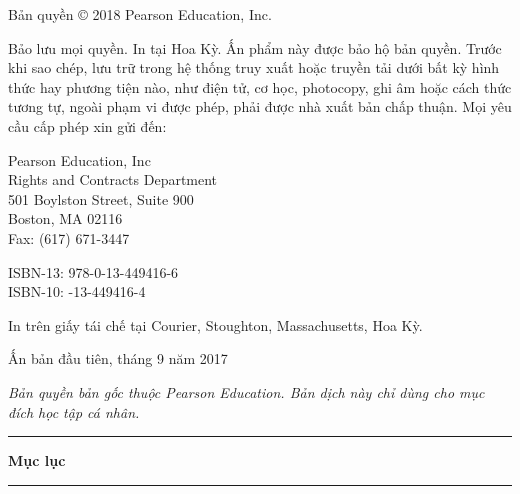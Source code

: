 \documentclass[10pt,twoside,openright]{book}
\makeatletter
\renewcommand{\cleardoublepage}{\clearpage}
\def\cc@pretop{-2.6pt}
\def\cc@fr@afterA{0.3pt}
\def\cc@fr@afterB{12.7pt}
\def\cc@fr@bodygap{35.6pt}
\def\@makeschapterhead#1{%
  \vspace*{\cc@pretop}%
  {\parindent\z@\raggedleft
    \rule{\textwidth}{0.75pt}\par
    \addvspace{\cc@fr@afterA}%
    {\fontsize{36}{40}\selectfont\bfseries #1\par}%
    \addvspace{\cc@fr@afterB}%
    \rule{\textwidth}{0.75pt}\par
    \addvspace{\cc@fr@bodygap}%
  }%
  \par\nobreak
  \setcounter{footnote}{0}%
}
\renewcommand{\contentsname}{Mục lục}
\newcommand{\cctableofcontents}{%
  \cleardoublepage
  \thispagestyle{plain}%
  \markboth{\contentsname}{\contentsname}%
  \@makeschapterhead{\contentsname}%
  \@starttoc{toc}%
}
\makeatother
\begin{document}
\vspace{5pt}
\noindent Bản quyền \copyright{} 2018 Pearson Education, Inc.\par
\vspace{5pt}
\noindent Bảo lưu mọi quyền. In tại Hoa Kỳ. Ấn phẩm này được bảo hộ bản quyền.
Trước khi sao chép, lưu trữ trong hệ thống truy xuất hoặc truyền tải dưới bất
kỳ hình thức hay phương tiện nào, như điện tử, cơ học, photocopy, ghi âm hoặc
cách thức tương tự, ngoài phạm vi được phép, phải được nhà xuất bản chấp thuận.
Mọi yêu cầu cấp phép xin gửi đến:\par
\vspace{3pt}
\hspace*{20pt}Pearson Education, Inc\\
\hspace*{20pt}Rights and Contracts Department\\
\hspace*{20pt}501 Boylston Street, Suite 900\\
\hspace*{20pt}Boston, MA 02116\\
\hspace*{20pt}Fax: (617) 671-3447\par
\vspace{5pt}
\noindent ISBN-13: 978-0-13-449416-6\\
ISBN-10: -13-449416-4\par
\vspace{5pt}
\noindent In trên giấy tái chế tại Courier, Stoughton, Massachusetts, Hoa Kỳ.\par
\vspace{5pt}
\noindent Ấn bản đầu tiên, tháng 9 năm 2017\par
\vspace{12pt}
\noindent\textit{Bản quyền bản gốc thuộc Pearson Education. Bản dịch này chỉ dùng
cho mục đích học tập cá nhân.}\par
\endgroup

\cctableofcontents



\mainmatter


\backmatter

\end{document}
